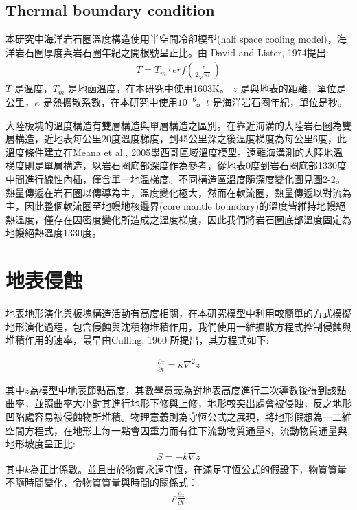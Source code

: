 \subsection{Thermal boundary condition}
本研究中海洋岩石圈溫度構造使用半空間冷卻模型(half space cooling model)，海洋岩石圈厚度與岩石圈年紀之開根號呈正比。由 David and Lister, 1974提出:
\begin{align}
T=T_m\cdot {erf}(\frac{z}{2\sqrt{\kappa t}})
\end{align}
$T$ 是溫度，$T_m$ 是地函溫度，在本研究中使用1603K。
$z$ 是與地表的距離，單位是公里，$\kappa$ 是熱擴散系數，在本研究中使用$10^{-6}$。$t$ 是海洋岩石圈年紀，單位是秒。

大陸板塊的溫度構造有雙層構造與單層構造之區別。在靠近海溝的大陸岩石圈為雙層構造，近地表每公里20度溫度梯度，到45公里深之後溫度梯度為每公里6度，此溫度條件建立在Meana et al., 2005墨西哥區域溫度模型。遠離海溝測的大陸地溫梯度則是單層構造，以岩石圈底部深度作為參考，從地表0度到岩石圈底部1330度中間進行線性內插，僅含單一地溫梯度。不同構造區溫度隨深度變化圖見圖2-2。熱量傳遞在岩石圈以傳導為主，溫度變化極大，然而在軟流圈，熱量傳遞以對流為主，因此整個軟流圈至地幔地核邊界(core mantle boundary)的溫度皆維持地幔絕熱溫度，僅存在因密度變化所造成之溫度梯度，因此我們將岩石圈底部溫度固定為地幔絕熱溫度1330度。

\section{地表侵蝕}
地表地形演化與板塊構造活動有高度相關，在本研究模型中利用較簡單的方式模擬地形演化過程，包含侵蝕與沈積物堆積作用，我們使用一維擴散方程式控制侵蝕與堆積作用的速率，最早由Culling, 1960 所提出，其方程式如下:

\begin{align}
\frac{\partial z}{\partial t} = \kappa \nabla^2 z \label{eq: erosion}
\end{align}

其中$z$為模型中地表節點高度，其數學意義為對地表高度進行二次導數後得到該點曲率，並照曲率大小對其進行地形下修與上修，地形較突出處會被侵蝕，反之地形凹陷處容易被侵蝕物所堆積。物理意義則為守恆公式之展現，將地形假想為一二維空間方程式，在地形上每一點會因重力而有往下流動物質通量S，流動物質通量與地形坡度呈正比:
\begin{align}
S = -k\nabla z \label{eq: S}
\end{align}
其中$k$為正比係數。並且由於物質永遠守恆，在滿足守恆公式的假設下，物質質量不隨時間變化，令物質質量與時間的關係式：
\begin{align}
\rho\frac{\partial z}{\partial t}\label{eq:rho}
\end{align}

